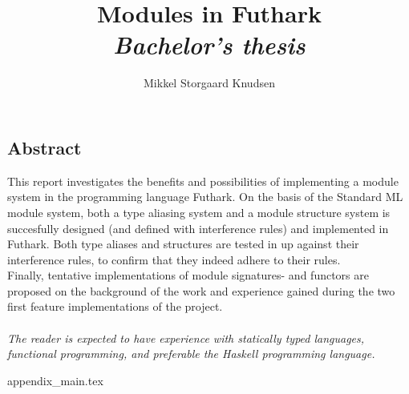 \documentclass[12pt]{article}
\title{
  Modules in Futhark \\
\textit{Bachelor's thesis}
}
\author{Mikkel Storgaard Knudsen}
\begin{document}
\maketitle

\subsection*{Abstract}
\label{subsec:abstract}
This report investigates the benefits and possibilities of implementing a module system in the programming language Futhark. On the basis of the Standard ML module system, both a type aliasing system and a module structure system is succesfully designed (and defined with interference rules) and implemented in Futhark.
Both type aliases and structures are tested in up against their interference rules, to confirm that they indeed adhere to their rules.\\
Finally, tentative implementations of module signatures- and functors are proposed on the background of the work and experience gained during the two first feature implementations of the project.
\\\\
\textit{The reader is expected to have experience with statically typed languages,
functional programming, and preferable the Haskell programming language.\\}

\clearpage
\tableofcontents
\clearpage

\clearpage

\clearpage

\clearpage

\clearpage

\clearpage









{appendix_main.tex}




\end{document}
